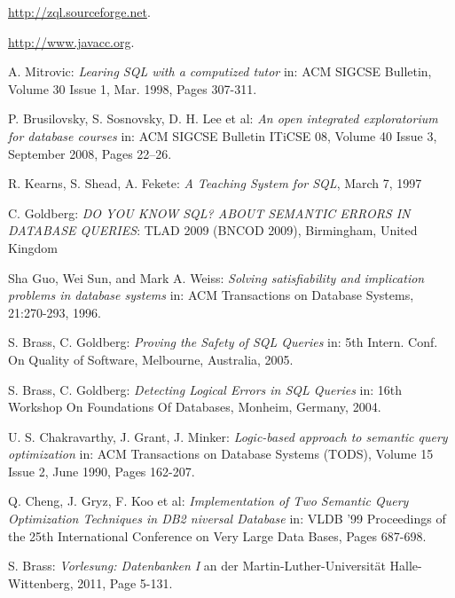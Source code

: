 \documentclass[12pt]{scrreprt}
\theoremstyle{remark}
\begin{document}
\begin{thebibliography}{9}
 \url{http://zql.sourceforge.net}.

 \newblock\url{http://www.javacc.org}.

A. Mitrovic: \emph{Learing SQL with a computized tutor} in: ACM SIGCSE Bulletin, Volume 30 		Issue 1, Mar. 1998, Pages 307-311. 

P. Brusilovsky, S. Sosnovsky, D. H. Lee et al: \emph{An open integrated exploratorium for 		database courses} in: ACM SIGCSE Bulletin  ITiCSE 08, Volume 40 Issue 3, September 2008, Pages 22--26.

R. Kearns, S. Shead, A. Fekete: \emph{A Teaching System for SQL}, March 7, 1997 

C. Goldberg: \emph{DO YOU KNOW SQL? ABOUT SEMANTIC ERRORS IN DATABASE QUERIES}: TLAD 2009 (BNCOD 2009), Birmingham, United Kingdom

Sha Guo, Wei Sun, and Mark A. Weiss: \emph{Solving satisfiability and implication problems in database systems} in: ACM Transactions on Database Systems, 21:270-293,
1996.

S. Brass, C. Goldberg: \emph{Proving the Safety of SQL Queries} in: 5th Intern. Conf. On Quality of Software, Melbourne, Australia, 2005.

S. Brass, C. Goldberg: \emph{Detecting Logical Errors in SQL Queries} in: 16th Workshop On Foundations Of Databases, Monheim, Germany, 2004.

U. S. Chakravarthy, J. Grant, J. Minker: \emph{Logic-based approach to semantic query optimization} in: ACM Transactions on Database Systems (TODS), Volume 15 Issue 2, June 1990, Pages 162-207.

Q. Cheng, J. Gryz, F. Koo et al: \emph{Implementation of Two Semantic Query Optimization Techniques in DB2 niversal Database} in: VLDB '99 Proceedings of the 25th International Conference on Very Large Data Bases, Pages 687-698.

S. Brass: \emph{Vorlesung: Datenbanken I} an der Martin-Luther-Universität Halle-Wittenberg, 2011, Page 5-131.

\end{thebibliography}



\end{document}
